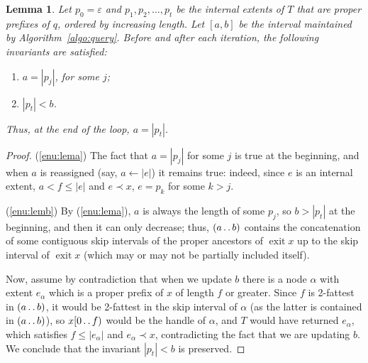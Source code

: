 \documentclass[a4paper,11pt]{article}
\newtheorem{lemma}[theorem]{Lemma}
\newcommand{\eps}{\varepsilon}
\newcommand{\?}{\mskip1.5mu}
\def\..{\,\mathpunct{\ldotp\ldotp}} %
\DeclareMathOperator{\exit}{exit}
\begin{document}
\begin{lemma}\label{lem:correctness}
Let $p_0 = \eps$ and $p_1, p_2, \dots ,p_t$ be the internal 
extents of $T$ that are \emph{proper} prefixes of $q$, ordered by 
increasing length.  Let $[a, b]$ be the interval maintained by 
Algorithm~\ref{algo:query}. Before and after each iteration, the 
following invariants are satisfied: 
\begin{enumerate}
    \item\label{enu:lema} $a = |p_j|$, for some $j$;
    \item\label{enu:lemb} $|p_t|< b$.
\end{enumerate}
Thus, at the end of the loop, $a=|p_t|$.
\end{lemma}
\begin{proof}
\noindent(\ref{enu:lema})
The fact that $a=|p_j|$ for some $j$ is true at the beginning, and when
$a$ is reassigned (say, $a \leftarrow |e|$) it remains true: indeed, since $e$
is an internal extent, $a<f\leq |e|$ and $e\prec x$, $e=p_k$ for some $k>j$.

\noindent(\ref{enu:lemb})
By (\ref{enu:lema}), $a$ is always the length of some $p_j$,
so $b>|p_t|$ at the beginning, and then it can only decrease; thus,
$(a\..b)$ contains the concatenation of some contiguous skip intervals of the
proper ancestors of $\exit x$ up to the skip interval of $\exit x$ (which may
or may not be partially included itself).

Now, assume by contradiction that when we update $b$ there is a node $\alpha$
with extent $e_\alpha$ which is a proper
prefix of $x$ of length $f$ or greater. Since $f$ is 2-fattest in $(a\..b)$, it
would be 2-fattest in the skip interval of $\alpha$ (as the latter is contained
in $(a\..b)$), so $x[0\..f)$ would be the handle of $\alpha$, and $T$ would have
returned $e_\alpha$, which satisfies $f\leq |e_\alpha|$ and $e_\alpha\prec x$, contradicting the fact that we are
updating $b$. We conclude that the invariant $|p_t|<b$ is preserved.
\end{proof}
\end{document}
